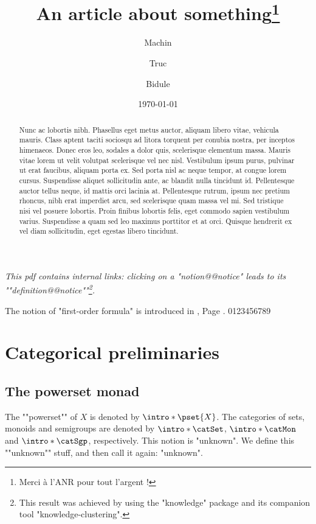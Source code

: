 \documentclass{fancy-article}
\title{An article about something\thanks{Merci à l'ANR pour tout l'argent !}}
\author[1]{Machin}
\author[2]{Truc}
\author[1]{Bidule}
\affil[1]{Institut du Fromage}
\affil[2]{Baguette Université Sorbonne-Est}
\date{\today}
\begin{document}
\maketitle

\begin{abstract}
  Nunc ac lobortis nibh. Phasellus eget metus auctor, aliquam libero vitae, vehicula mauris. Class aptent taciti sociosqu ad litora torquent per conubia nostra, per inceptos himenaeos. Donec eros leo, sodales a dolor quis, scelerisque elementum massa. Mauris vitae lorem ut velit volutpat scelerisque vel nec nisl. Vestibulum ipsum purus, pulvinar ut erat faucibus, aliquam porta ex. Sed porta nisl ac neque tempor, at congue lorem cursus. Suspendisse aliquet sollicitudin ante, ac blandit nulla tincidunt id. Pellentesque auctor tellus neque, id mattis orci lacinia at. Pellentesque rutrum, ipsum nec pretium rhoncus, nibh erat imperdiet arcu, sed scelerisque quam massa vel mi. Sed tristique nisi vel posuere lobortis. Proin finibus lobortis felis, eget commodo sapien vestibulum varius. Suspendisse a quam sed leo maximus porttitor et at orci. Quisque hendrerit ex vel diam sollicitudin, eget egestas libero tincidunt. 
\end{abstract}

\AP\emph{%
This pdf contains internal links: clicking on a "notion@@notice" leads to its
""definition@@notice""\footnote{This result was achieved by using the "knowledge" package
and its companion tool "knowledge-clustering".}.
}

The notion of "first-order formula" is introduced in
, Page .
0123456789

\section{Categorical preliminaries}
 
\subsection{The powerset monad}

\AP The ""powerset"" of $X$ is denoted by $\intro*\pset{X}$. The categories
of sets, monoids and semigroups are denoted by $\intro*\catSet$,
$\intro*\catMon$ and $\intro*\catSgp$, respectively.
This notion is "unknown". We define this ""unknown"" stuff, and then call it again: "unknown".
\end{document}
